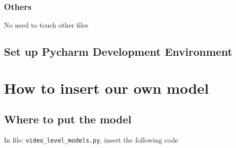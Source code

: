 \documentclass[11pt]{article}
\begin{document}
\subsubsection{Others}
\label{sec:org3ae6745}

No need to touch other files

\subsection{Set up Pycharm Development Environment}
\label{sec:orgb917edf}
\section{How to insert our own model}
\label{sec:org8aba012}
\subsection{Where to put the model}
\label{sec:orgc99ad49}

In file: \texttt{video\_level\_models.py}, insert the following code
\end{document}
